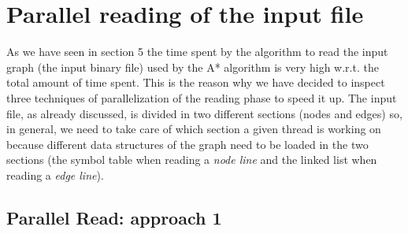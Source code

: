 \documentclass[twocolumn, switch]{article} %
\begin{document}
\section{Parallel reading of the input file}
As we have seen in section 5 the time spent by the algorithm to read the input graph
(the input binary file) used by the A* algorithm is very high w.r.t. the total
amount of time spent. This is the reason why we have decided to inspect three techniques of
parallelization of the reading phase to speed it up. The input file, as already discussed,
is divided in two different sections (nodes and edges) so, in general, we need to take care of which
section a given thread is working on because different data structures of the graph need to
be loaded in the two sections (the symbol table when reading a \textit{node line} and the linked list when
reading a \textit{edge line}).
\subsection{Parallel Read: approach 1}

\end{document}
